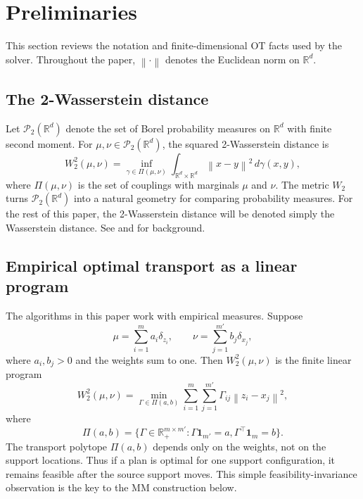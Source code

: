 \documentclass[pdflatex,sn-mathphys-ay]{sn-jnl}%
\theoremstyle{thmstyleone}%
\theoremstyle{thmstyletwo}%
\theoremstyle{thmstylethree}%
\newcommand{\R}{\mathbb R}
\newcommand{\calP}{\mathcal P}
\newcommand{\norm}[1]{\left\lVert #1\right\rVert}
\begin{document}
\section{Preliminaries}\label{sec:prelim}

This section reviews the notation and finite-dimensional OT facts used by the solver. Throughout the paper, \(\norm{\cdot}\) denotes the Euclidean norm on \(\R^d\).

\subsection{The 2-Wasserstein distance}

Let \(\calP_2(\R^d)\) denote the set of Borel probability measures on \(\R^d\) with finite second moment. For \(\mu,\nu\in\calP_2(\R^d)\), the squared 2-Wasserstein distance is
\begin{equation}\label{eq:w2}
    W_2^2(\mu,\nu)
    =
    \inf_{\gamma\in\Pi(\mu,\nu)}
    \int_{\R^d\times\R^d}\norm{x-y}^2\,d\gamma(x,y),
\end{equation}
where \(\Pi(\mu,\nu)\) is the set of couplings with marginals \(\mu\) and \(\nu\). The metric \(W_2\) turns \(\calP_2(\R^d)\) into a natural geometry for comparing probability measures. For the rest of this paper, the 2-Wasserstein distance will be denoted simply the Wasserstein distance. See  \citet{villani_2009_OptimalTransportOld} and \citet{ambrosio_2021_LecturesOptimalTransport} for background.






\subsection{Empirical optimal transport as a linear program}

The algorithms in this paper work with empirical measures. Suppose
\[
    \mu=\sum_{i=1}^m a_i\delta_{z_i},
    \qquad
    \nu=\sum_{j=1}^{m'} b_j\delta_{x_j},
\]
where \(a_i,b_j>0\) and the weights sum to one. Then \(W_2^2(\mu,
\nu)\) is the finite linear program
\begin{equation}\label{eq:empirical-lp}
    W_2^2(\mu,\nu)
    =
    \min_{\Gamma\in\Pi(a,b)}
    \sum_{i=1}^{m}\sum_{j=1}^{m'}
    \Gamma_{ij}\norm{z_i-x_j}^2,
\end{equation}
where
\[
    \Pi(a,b)=\{\Gamma\in\R_+^{m\times m'}:\Gamma\mathbf 1_{m'}=a,
    \Gamma^\top\mathbf 1_m=b\}.
\]
The transport polytope \(\Pi(a,b)\) depends only on the weights, not on the support locations. Thus if a plan is optimal for one support configuration, it remains feasible after the source support moves. This simple feasibility-invariance observation is the key to the MM construction below.
\end{document}
